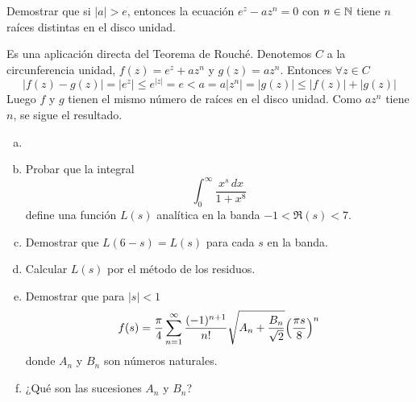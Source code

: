 \documentclass[twoside]{article}
\begin{document}
\begin{ejercicio}{6}
Demostrar que si $|a|>e$, entonces la ecuación $e^z-az^n=0$ con $n\in\mathbb{N}$ tiene $n$ raíces distintas en el disco unidad. 
\end{ejercicio}
\begin{solucion}
Es una aplicación directa del Teorema de Rouché. Denotemos $C$ a la circunferencia unidad, $f(z)=e^z+az^n$ y $g(z)=az^n$. Entonces $\forall z \in C$
$$
|f(z)-g(z)| = |e^z| \leq e^{|z|}=e < a = a|z^n| = |g(z)| \leq |f(z)|+|g(z)|
$$
Luego $f$ y $g$ tienen el mismo número de raíces en el disco unidad. Como $az^n$ tiene $n$, se sigue el resultado.
\end{solucion}
\newpage
\begin{ejercicio}{7}
\begin{enumerate}[a)]
\item[]
\item Probar que la integral
\[\int_0^\infty \frac{x^s\,dx}{1+x^8}\]
define una función $L(s)$ analítica en la banda $-1<\Re(s)<7$.
\item Demostrar que $L(6-s)=L(s)$ para cada $s$ en la banda.
\item Calcular $L(s)$ por el método de los residuos.
\item Demostrar que para $|s|<1$ 
\[f(s)=\frac{\pi}{4}\sum_{n=1}^\infty \frac{(-1)^{n+1}}{n!}\sqrt{A_n+\frac{B_n}{\sqrt{2}}}
\Bigl(\frac{\pi s}{8}\Bigr)^n\]
donde $A_n$ y $B_n$ son números naturales.
\item ¿Qué son las sucesiones $A_n$ y $B_n$?
\end{enumerate}
\end{ejercicio}
\end{document}
